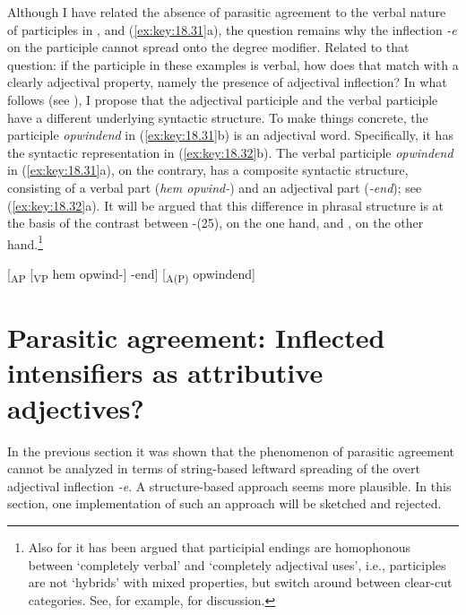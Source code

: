 \documentclass[output=paper]{langsci/langscibook}
\begin{document}
Although I have related the absence of parasitic agreement to the verbal nature
of participles in ,  and (\ref{ex:key:18.31}a), the
question remains why the inflection \emph{-e} on the participle cannot spread
onto the degree modifier. Related to that question: if the participle in these
examples is verbal, how does that match with a clearly adjectival property,
namely the presence of adjectival inflection? In what follows (see
), I propose that the adjectival participle and the verbal
participle have a different underlying syntactic structure. To make things
concrete, the participle \emph{opwindend} in (\ref{ex:key:18.31}b) is an adjectival
word. Specifically, it has the syntactic representation in (\ref{ex:key:18.32}b).
The verbal participle \emph{opwindend} in (\ref{ex:key:18.31}a), on the contrary,
has a composite syntactic structure, consisting of a verbal part (\emph{hem
opwind-}) and an adjectival part (\emph{-end}); see (\ref{ex:key:18.32}a). It will
be argued that this difference in phrasal structure is at the basis of the
contrast between -(25), on the one hand, and , on
the other hand.\footnote{Also for  it has been argued that participial
endings are homophonous between \enquote*{completely verbal} and
\enquote*{completely adjectival uses}, i.e., participles are not
\enquote*{hybrids} with mixed properties, but switch around between clear-cut
categories. See, for example, \citet{Toman1986} for discussion.}

\ea%
    \label{ex:key:18.32}
    \ea {}[\textsubscript{AP} [\textsubscript{VP} hem opwind-] -end]
	\ex {}[\textsubscript{A(P)} opwindend]
	\z
\z

\section{Parasitic agreement: Inflected intensifiers as attributive
adjectives?}\label{sec:key:18.6}

In the previous section it was shown that the phenomenon of parasitic agreement
cannot be analyzed in terms of string-based leftward spreading of the overt
adjectival inflection \emph{-e}. A structure-based approach seems more
plausible. In this section, one implementation of such an approach will be
sketched and rejected.
\end{document}
